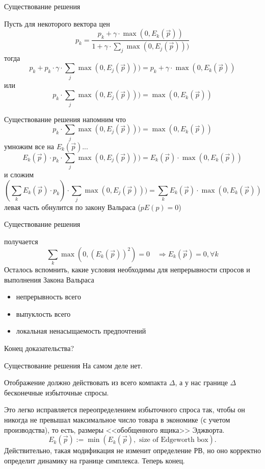 \documentclass{beamer}
\begin{document}
\begin{frame}{Существование решения}

Пусть для некоторого вектора цен
$$ p_k = \frac{p_k + \gamma \cdot \max(0, E_k(\vec p))}{1 + \gamma \cdot \sum_j \max(0, E_j(\vec p)))}$$
тогда
$$ p_k + p_k \cdot \gamma \cdot \sum_j \max(0, E_j(\vec p))) = p_k + \gamma \cdot \max(0, E_k(\vec p))$$
или 
$$ p_k \cdot \sum_j \max(0, E_j(\vec p))) =  \max(0, E_k(\vec p))$$

\end{frame}

\begin{frame}{Существование решения}
напомним что
$$ p_k \cdot \sum_j \max(0, E_j(\vec p))) =  \max(0, E_k(\vec p))$$
умножим все на $E_k(\vec p)$...
$$ E_k(\vec p) \cdot p_k \cdot \sum_j \max(0, E_j(\vec p))) =  E_k(\vec p) \cdot \max(0, E_k(\vec p))$$
и сложим
$$ (\sum_k E_k(\vec p) \cdot p_k) \cdot \sum_j \max(0, E_j(\vec p))) =  \sum_k E_k(\vec p) \cdot \max(0, E_k(\vec p))$$
левая часть обнулится по закону Вальраса ($p E(p) = 0$)
\end{frame}

\begin{frame}{Существование решения}

получается 
$$\sum_k \max(0, (E_k(\vec p))^2) = 0 \quad \Rightarrow E_k(\vec p) = 0, \forall k$$
Осталось вспомнить, какие условия необходимы для непрерывности спросов и выполнения Закона Вальраса
\begin{itemize}
  \item непрерывность всего
  \item выпуклость всего
  \item локальная ненасыщаемость предпочтений
\end{itemize}

Конец доказательства?
\end{frame}

\begin{frame}{Существование решения}
На самом деле нет. 

Отображение должно действовать из всего компакта $\Delta$, а у нас границе $\Delta$ бесконечные избыточные спросы. 

Это легко исправляется переопределением избыточного спроса так, чтобы он никогда не превышал максимальное число товара в экономике (с учетом производства), то есть, размеры <<обобщенного ящика>> Эджворта.
$$
E_k(\vec p) := \min(E_k(\vec p), \text{ size of Edgeworth box}).
$$
Действительно, такая модификация не изменит определение РВ, но оно корректно определит динамику на границе симплекса. Теперь конец.

\end{frame}
\end{document}

